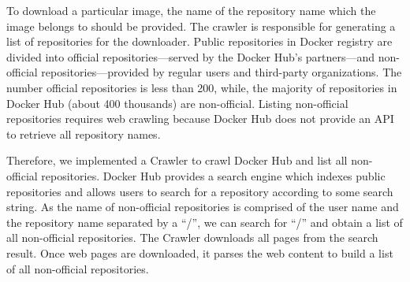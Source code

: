 %
To download a particular image, %
the name of the repository name which the image belongs to should be provided.
The crawler is responsible
for generating a list of repositories for the downloader.
%
%
%
%
Public repositories in Docker registry are divided into official
repositories---served by the Docker Hub's partners---and non-official
repositories---provided
by regular users and third-party organizations.
%
%
The number official repositories is less than 200,
while, the majority
of repositories in Docker Hub (about 400 thousands)
are non-official.
Listing non-official repositories requires web crawling because
Docker Hub does not provide an API to retrieve all repository names.

Therefore, we implemented a Crawler to crawl Docker Hub and list all non-official
repositories.
%
Docker Hub provides a search engine which indexes public repositories and allows
users to search for a repository according to
some search string. 
%
As the name of non-official repositories is comprised
of the user name and the repository name separated by a ``/'',
we can search for ``/'' and obtain a list of all non-official
repositories.
%
%
%
The Crawler downloads all pages from the search result.
%
Once web pages are downloaded, it parses the web content to build a list of
all non-official repositories.




